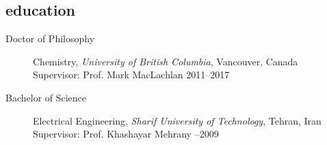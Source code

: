 \documentclass[overlapped,line,10pt,letterpaper]{res}
\begin{document}
\begin{resume}
\section{education}
\begin{description}
\item [Doctor of Philosophy] Chemistry, \emph{University of British Columbia}, Vancouver, Canada   \\ Supervisor: Prof. Mark MacLachlan \hspace{\fill} 2011–2017
\item [Bachelor of Science] Electrical Engineering, \emph{Sharif University of Technology}, Tehran, Iran \\ Supervisor: Prof. Khashayar Mehrany \hspace{}–2009
\end{description}


\end{resume}
\end{document}

